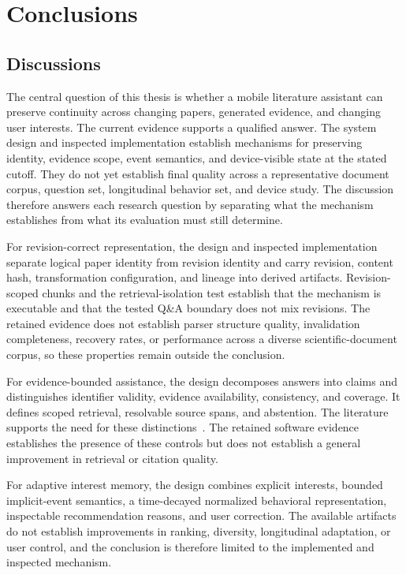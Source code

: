 ﻿%

\chapter{Conclusions}

\section{Discussions}

The central question of this thesis is whether a mobile literature assistant can preserve continuity across changing papers, generated evidence, and changing user interests.
The current evidence supports a qualified answer.
The system design and inspected implementation establish mechanisms for preserving identity, evidence scope, event semantics, and device-visible state at the stated cutoff.
They do not yet establish final quality across a representative document corpus, question set, longitudinal behavior set, and device study.
The discussion therefore answers each research question by separating what the mechanism establishes from what its evaluation must still determine.

For revision-correct representation, the design and inspected implementation separate logical paper identity from revision identity and carry revision, content hash, transformation configuration, and lineage into derived artifacts.
Revision-scoped chunks and the retrieval-isolation test establish that the mechanism is executable and that the tested Q\&A boundary does not mix revisions.
The retained evidence does not establish parser structure quality, invalidation completeness, recovery rates, or performance across a diverse scientific-document corpus, so these properties remain outside the conclusion.

For evidence-bounded assistance, the design decomposes answers into claims and distinguishes identifier validity, evidence availability, consistency, and coverage.
It defines scoped retrieval, resolvable source spans, and abstention.
The literature supports the need for these distinctions~\cite{gao2023alce,es2024ragas,huang2024grounded,niu2024ragtruth}.
The retained software evidence establishes the presence of these controls but does not establish a general improvement in retrieval or citation quality.

For adaptive interest memory, the design combines explicit interests, bounded implicit-event semantics, a time-decayed normalized behavioral representation, inspectable recommendation reasons, and user correction.
The available artifacts do not establish improvements in ranking, diversity, longitudinal adaptation, or user control, and the conclusion is therefore limited to the implemented and inspected mechanism.

